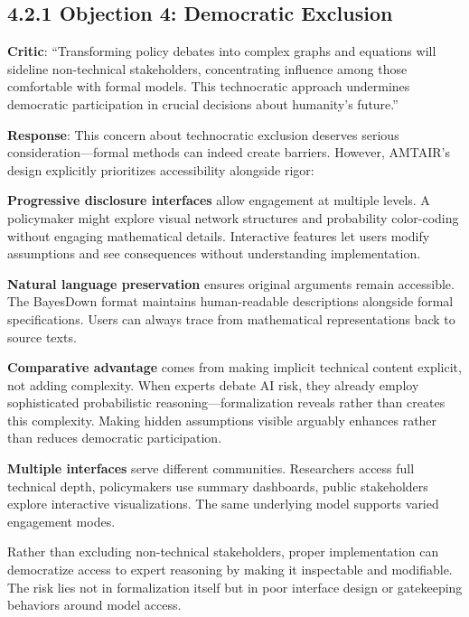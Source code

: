 \documentclass[
  11pt,
  letterpaper,
]{book}
\begin{document}

\subsection*{4.2.1 Objection 4: Democratic
Exclusion}\label{sec-democratic-exclusion}

\textbf{Critic}: ``Transforming policy debates into complex graphs and
equations will sideline non-technical stakeholders, concentrating
influence among those comfortable with formal models. This technocratic
approach undermines democratic participation in crucial decisions about
humanity's future.''

\textbf{Response}: This concern about technocratic exclusion deserves
serious consideration---formal methods can indeed create barriers.
However, AMTAIR's design explicitly prioritizes accessibility alongside
rigor:

\textbf{Progressive disclosure interfaces} allow engagement at multiple
levels. A policymaker might explore visual network structures and
probability color-coding without engaging mathematical details.
Interactive features let users modify assumptions and see consequences
without understanding implementation.

\textbf{Natural language preservation} ensures original arguments remain
accessible. The BayesDown format maintains human-readable descriptions
alongside formal specifications. Users can always trace from
mathematical representations back to source texts.

\textbf{Comparative advantage} comes from making implicit technical
content explicit, not adding complexity. When experts debate AI risk,
they already employ sophisticated probabilistic
reasoning---formalization reveals rather than creates this complexity.
Making hidden assumptions visible arguably enhances rather than reduces
democratic participation.

\textbf{Multiple interfaces} serve different communities. Researchers
access full technical depth, policymakers use summary dashboards, public
stakeholders explore interactive visualizations. The same underlying
model supports varied engagement modes.

Rather than excluding non-technical stakeholders, proper implementation
can democratize access to expert reasoning by making it inspectable and
modifiable. The risk lies not in formalization itself but in poor
interface design or gatekeeping behaviors around model access.
\end{document}
